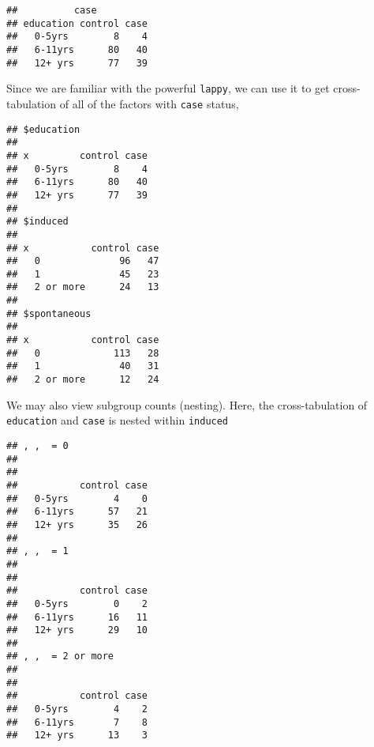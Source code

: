 \documentclass[]{book}
\newenvironment{Shaded}{\begin{snugshade}}{\end{snugshade}}
\newcommand{\KeywordTok}[1]{\textcolor[rgb]{0.13,0.29,0.53}{\textbf{{#1}}}}
\newcommand{\StringTok}[1]{\textcolor[rgb]{0.31,0.60,0.02}{{#1}}}
\newcommand{\NormalTok}[1]{{#1}}
\theoremstyle{definition}
\theoremstyle{definition}
\theoremstyle{remark}
\begin{document}
\begin{verbatim}
##          case
## education control case
##   0-5yrs        8    4
##   6-11yrs      80   40
##   12+ yrs      77   39
\end{verbatim}

Since we are familiar with the powerful \texttt{lappy}, we can use it to
get cross-tabulation of all of the factors with \texttt{case} status,

\begin{Shaded}
\end{Shaded}

\begin{verbatim}
## $education
##          
## x         control case
##   0-5yrs        8    4
##   6-11yrs      80   40
##   12+ yrs      77   39
## 
## $induced
##            
## x           control case
##   0              96   47
##   1              45   23
##   2 or more      24   13
## 
## $spontaneous
##            
## x           control case
##   0             113   28
##   1              40   31
##   2 or more      12   24
\end{verbatim}

We may also view subgroup counts (nesting). Here, the cross-tabulation
of \texttt{education} and \texttt{case} is nested within
\texttt{induced}

\begin{Shaded}
\end{Shaded}

\begin{verbatim}
## , ,  = 0
## 
##          
##           control case
##   0-5yrs        4    0
##   6-11yrs      57   21
##   12+ yrs      35   26
## 
## , ,  = 1
## 
##          
##           control case
##   0-5yrs        0    2
##   6-11yrs      16   11
##   12+ yrs      29   10
## 
## , ,  = 2 or more
## 
##          
##           control case
##   0-5yrs        4    2
##   6-11yrs       7    8
##   12+ yrs      13    3
\end{verbatim}
\end{document}
